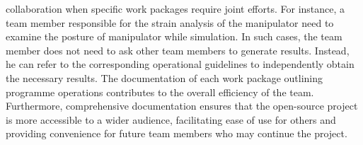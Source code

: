 \documentclass[11pt]{report} %
\begin{document}
collaboration when specific work packages require joint efforts. 
For instance, a team member responsible for the strain analysis of 
the manipulator need to examine the posture of manipulator while 
simulation. In such cases, the team member does not need to ask 
other team members to generate results. Instead, he can refer to 
the corresponding operational guidelines to independently obtain 
the necessary results. The documentation of each work package 
outlining programme operations contributes to the overall 
efficiency of the team. Furthermore, comprehensive documentation 
ensures that the open-source project is more accessible to a wider 
audience, facilitating ease of use for others and providing 
convenience for future team members who may continue the project.



\end{document}
